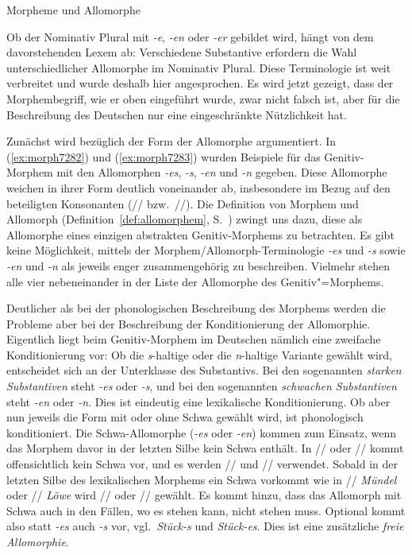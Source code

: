\begin{Vertiefung}{Morpheme und Allomorphe}
\begin{exe}
  \ex \label{ex:morph9241}
  \begin{xlist}
  \end{xlist}
\end{exe}

Ob der Nominativ Plural mit \textit{-e}, \textit{-en} oder \textit{-er} gebildet wird, hängt von dem davorstehenden Lexem ab:
Verschiedene Substantive erfordern die Wahl unterschiedlicher Allomorphe im Nominativ Plural.
Diese Terminologie ist weit verbreitet und wurde deshalb hier angesprochen.
Es wird jetzt gezeigt, dass der Morphembegriff, wie er oben eingeführt wurde, zwar nicht falsch ist, aber für die Beschreibung des Deutschen nur eine eingeschränkte Nützlichkeit hat.

Zunächst wird bezüglich der Form der Allomorphe argumentiert. 
In (\ref{ex:morph7282}) und (\ref{ex:morph7283}) wurden Beispiele für das Genitiv-Morphem mit den Allomorphen \textit{-es}, \textit{-s}, \textit{-en} und \textit{-n} gegeben.
Diese Allomorphe weichen in ihrer Form deutlich voneinander ab, insbesondere im Bezug auf den beteiligten Konsonanten (// bzw.\ //).
Die Definition von Morphem und Allomorph (Definition~\ref{def:allomorphem}, S.~\pageref{def:allomorphem}) zwingt uns dazu, diese als Allomorphe eines einzigen abstrakten Genitiv-Morphems zu betrachten.
Es gibt keine Möglichkeit, mittels der Morphem\slash Allomorph-Terminologie \textit{-es} und \textit{-s} sowie \textit{-en} und \textit{-n} als jeweils enger zusammengehörig zu beschreiben.
Vielmehr stehen alle vier nebeneinander in der Liste der Allomorphe des Genitiv"=Morphems.

Deutlicher als bei der phonologischen Beschreibung des Morphems werden die Probleme aber bei der Beschreibung der Konditionierung der Allomorphie.
Eigentlich liegt beim Genitiv-Morphem im Deutschen nämlich eine zweifache Konditionierung vor:
Ob die \textit{s}-haltige oder die \textit{n}-haltige Variante gewählt wird, entscheidet sich an der Unterklasse des Substantivs.
Bei den sogenannten \textit{starken Substantiven} steht \textit{-es} oder \textit{-s}, und bei den sogenannten \textit{schwachen Substantiven} steht \textit{-en} oder \textit{-n}.
Dies ist eindeutig eine lexikalische Konditionierung.
Ob aber nun jeweils die Form mit oder ohne Schwa gewählt wird, ist phonologisch konditioniert.
Die Schwa-Allomorphe (\textit{-es} oder \textit{-en}) kommen zum Einsatz, wenn das Morphem davor in der letzten Silbe kein Schwa enthält.
In // oder // kommt offensichtlich kein Schwa vor, und es werden // und // verwendet.
Sobald in der letzten Silbe des lexikalischen Morphems ein Schwa vorkommt wie in // \textit{Mündel} oder // \textit{Löwe} wird // oder // gewählt.
Es kommt hinzu, dass das Allomorph mit Schwa auch in den Fällen, wo es stehen kann, nicht stehen muss.
Optional kommt also statt \textit{-es} auch \textit{-s} vor, vgl.\ \textit{Stück-s} und \textit{Stück-es}.
Dies ist eine zusätzliche \textit{freie Allomorphie}.


\end{Vertiefung}
